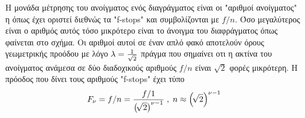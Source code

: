 \documentclass[a4paper,11pt]{article}
\DeclareRobustCommand{\frac}[3][0pt]{%
{\begingroup\hspace{#1}#2\hspace{#1}\endgroup\over\hspace{#1}#3\hspace{#1}}}
\begin{document}
\begin{center}
\def\nodeRot{0}
\newcommand*\poly[2][]{%
	\path (0,0) coordinate (C) [rotate/.append code={\def\nodeRot{##1}},#1]
	++ ({angleForPoly(0,#2,0)}:x_radius and y_radius) coordinate[d] (c)
	\foreach \cnt[count=\Cnt from 0] in {0,...,#2} {
		(c) [late options={alias=c'}] 
		coordinate[d] (c) at ({angleForPoly(\cnt,#2,0)}:x_radius and y_radius)
		(c') edge[-] (c)
		\ifnum\Cnt>0 node[anchor={angleForPoly(\Cnt,#2,(180-360/#2)+\nodeRot)},circle]{} \fi};}
\end{center}
Η μονάδα μέτρησης του ανοίγματος ενός διαγράγματος είναι οι "αριθμοί ανοίγματος" η όπως έχει οριστεί διεθνώς τα "f-stops" και συμβολίζονται με $ f/n $. Όσο μεγαλύτερος είναι ο αριθμός αυτός τόσο μικρότερο είναι το άνοιγμα του διαφράγματος όπως φαίνεται στο σχήμα. Οι αριθμοί αυτοί σε έναν απλό φακό αποτελούν όρους γεωμετρικής προόδου με λόγο $ \lambda=\frac{1}{\sqrt{2}}$ πράγμα που σημαίνει οτι η ακτίνα του ανοίγματος ανάμεσα σε δύο διαδοχικούς αριθμούς $ f/n $ είναι $ \sqrt{2} $ φορές μικρότερη. Η πρόοδος που δίνει τους αριθμούς "f-stops" έχει τύπο
\[ F_\nu=f/n=\frac{f/1}{\left(\!\sqrt{2}\right)^{\nu-1} }\;,\;n\approx\left(\!\sqrt{2}\right)^{\nu-1} \]
\end{document}
